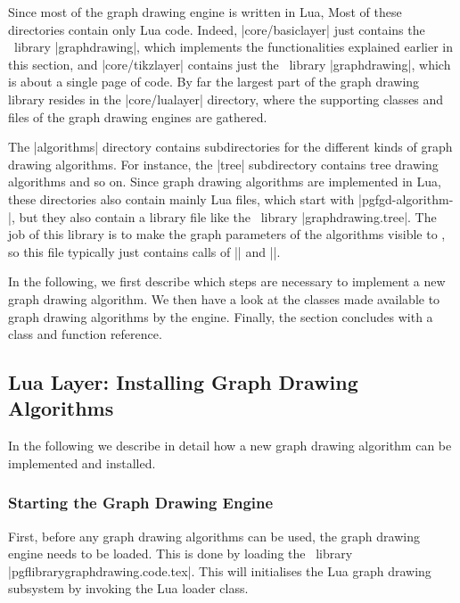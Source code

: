 Since most of the graph drawing engine is written in Lua, Most of
these directories contain only Lua code. Indeed, |core/basiclayer|
just contains the \pgfname\ library |graphdrawing|, which implements
the functionalities explained earlier in this section, and
|core/tikzlayer| contains just the \tikzname\ library |graphdrawing|,
which is about a single page of code. By far the largest part of the
graph drawing library resides in the |core/lualayer| directory, where
the supporting classes and files of the graph drawing engines are
gathered.

The |algorithms| directory contains subdirectories for the different
kinds of graph drawing algorithms. For instance, the |tree|
subdirectory contains tree drawing algorithms and so on. Since graph
drawing algorithms are implemented in Lua, these directories also
contain mainly Lua files, which start with |pgfgd-algorithm-|, but
they also contain a library file like the \pgfname\ library
|graphdrawing.tree|. The job of this library is to make the graph
parameters of the algorithms visible to \pgfname, so this file
typically just contains calls of |\pgfgddeclarealgorithmkey| and
|\pgfgddeclareforwardedkeys|.

In the following, we first describe which steps are necessary to
implement a new graph drawing algorithm. We then have a look at the
classes made available to graph drawing algorithms by the
engine. Finally, the section concludes with a class and function
reference.



\subsection{Lua Layer: Installing  Graph Drawing Algorithms}
\label{section-gd-implementing-algorithms}

In the following we describe in detail how a new graph drawing
algorithm can be implemented and installed. 


\subsubsection{Starting the Graph Drawing Engine}

First, before any graph drawing algorithms can be used, the graph
drawing engine needs to be loaded. This is done by loading the
\pgfname\ library |pgflibrarygraphdrawing.code.tex|. This will
initialises the Lua graph drawing subsystem by invoking the Lua loader
class.   

